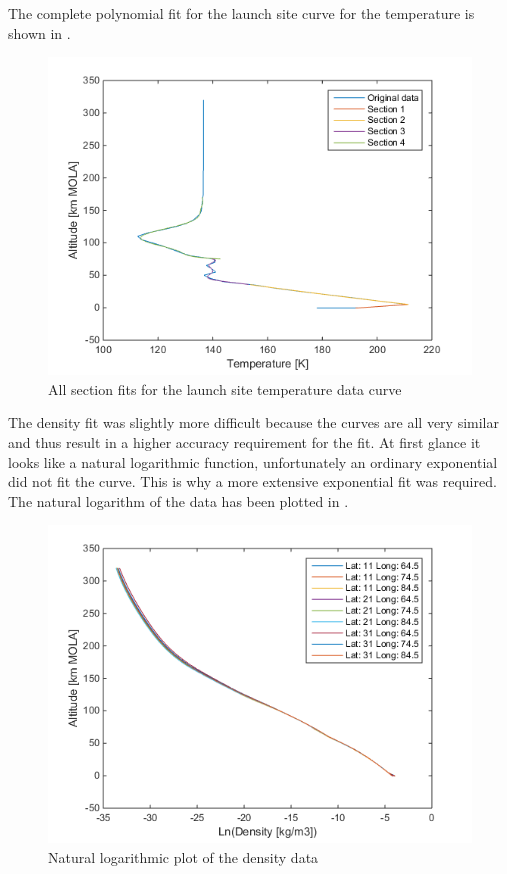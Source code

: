 The complete polynomial fit for the launch site curve for the temperature is shown in .

\begin{figure}[!ht]
\centering
\includegraphics[width=1.0\textwidth]{figures/software/completePolyFitTempSplit5.png}
\caption{All section fits for the launch site temperature data curve}
\label{fig:completePolyFitTempSplit5}
\end{figure}




The density fit was slightly more difficult because the curves are all very similar and thus result in a higher accuracy requirement for the fit. At first glance it looks like a natural logarithmic function, unfortunately an ordinary exponential did not fit the curve. This is why a more extensive exponential fit was required. The natural logarithm of the data has been plotted in .

\begin{figure}[!ht]
\centering
\includegraphics[width=1.0\textwidth]{figures/software/lnPlotDataDen.png}
\caption{Natural logarithmic plot of the density data}
\label{fig:lnPlotDataDen}
\end{figure}

